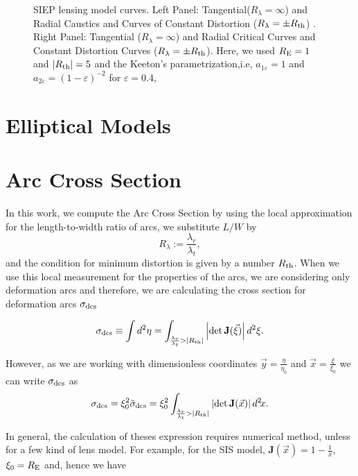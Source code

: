 \begin{figure}[!ht]
\caption{\label{siep_curves}  SIEP lensing model curves. Left Panel:
Tangential($R_\lambda=\infty$) and Radial Caustics and Curves of Constant
Distortion ($R_\lambda=\pm R_{\rm th}$) . Right Panel: Tangential
($R_\lambda=\infty$) and Radial Critical Curves and  Constant Distortion Curves
($R_\lambda=\pm R_{\rm th}$). Here, we used $R_{\rm E}=1$ and $|R_{\rm
th}|=5$ and the Keeton's parametrization,i.e,  $a_{1\varepsilon}=1$ and
$a_{2\varepsilon}=(1-\varepsilon)^{-2}$ for $\varepsilon=0.4$, }
\end{figure}


\section{Elliptical Models}

\section{Arc Cross Section}
In this work, we compute the Arc Cross Section by using the local approximation for the length-to-width ratio of arcs, we substitute $L/W$ by 
\begin{equation}
R_\lambda:=\dfrac{\lambda_r}{\lambda_t},
\end{equation}
and the condition for minimum distortion is given by a number $R_{\rm th}$.  When we use this local measurement for the properties of the arcs, we are considering only deformation arcs and therefore, we are calculating the cross section for deformation arcs $\sigma_{\rm dcs}$

\begin{equation}
\sigma_{\rm dcs} \equiv \int d^2\eta =\int_{ \frac{\lambda_r}{\lambda_t} > |R_{\rm th}|} \left |{\rm det}\,\textbf{J}(\vec{\xi}) \right| d^2\xi.
\end{equation}

However, as we are working with dimensionless coordinates $ \vec{y}=\frac{\eta}{\eta_0}$ and $\vec{x}=\frac{\xi}{\xi_0}$ we can write $\sigma_{\rm dcs}$ as
\begin{equation}
\sigma_{\rm dcs} = \xi_0^2\tilde{\sigma}_{\rm dcs}= \xi_0^2 \int_{ \frac{\lambda_r}{\lambda_t} > |R_{\rm th}|} \left |{\rm det}\,\textbf{J}(\vec{x}) \right| d^2\!x. \label{dcs_dimensionless}
\end{equation}

In general, the calculation of theses expression requires numerical method, unless for a few kind of lens model.  For example, for the SIS model, $\mathbf{J}(\vec{x})=1-\frac{1}{x}$, $\xi_0=R_{\mathrm{E}}$ and, hence we have

